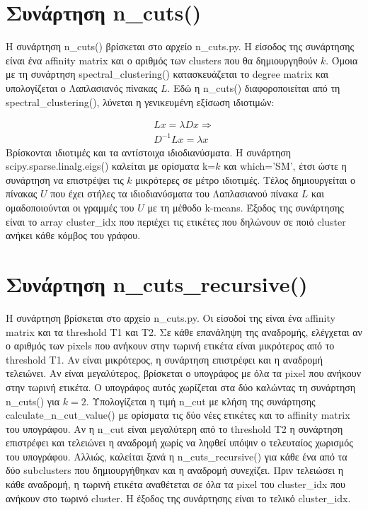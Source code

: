 \documentclass{article}
\begin{document}
\section{Συνάρτηση n\_cuts()}
Η συνάρτηση n\_cuts() βρίσκεται στο αρχείο n\_cuts.py. Η είσοδος της συνάρτησης 
είναι ένα affinity matrix και ο αριθμός των clusters που θα δημιουργηθούν $k$.
Όμοια με τη συνάρτηση spectral\_clustering() κατασκευάζεται το degree matrix 
και υπολογίζεται ο Λαπλασιανός πίνακας $L$. Εδώ η n\_cuts() διαφοροποιείται από τη
spectral\_clustering(), λύνεται η γενικευμένη εξίσωση ιδιοτιμών:

\begin{gather}
    Lx = \lambda Dx \Rightarrow \\
    D^{-1} Lx = \lambda x
\end{gather}
Βρίσκονται ιδιοτιμές και τα αντίστοιχα ιδιοδιανύσματα. Η συνάρτηση 
scipy.sparse.linalg.eigs() καλείται με ορίσμα\-τα k=$k$ και 
which='SM', έτσι ώστε η συνάρτηση να επιστρέψει τις $k$ μικρότερες σε μέτρο
ιδιοτιμές. Τέλος δημιουργεί\-ται ο πίνακας $U$
που έχει στήλες τα ιδιοδιανύσματα του Λαπλασιανού πίνακα $L$ και ομαδοποιούνται
οι γραμμές του $U$ με τη μέθοδο k-means. Έξοδος της συνάρτησης είναι το array 
cluster\_idx που περιέχει τις ετικέτες που δηλώνουν σε ποιό cluster ανήκει κάθε
κόμβος του γράφου.

\section{Συνάρτηση n\_cuts\_recursive()}
Η συνάρτηση βρίσκεται στο αρχείο n\_cuts.py. Οι είσοδοί της είναι ένα affinity matrix 
και τα threshold T1 και T2. Σε κάθε επανάληψη της αναδρομής,
ελέγχεται αν ο αριθμός των pixels που ανήκουν στην τωρινή ετικέτα είναι μικρότερος
από το threshold T1. Αν είναι μικρότερος, η συνάρτηση επιστρέφει 
και η αναδρομή τελειώνει. Αν είναι μεγαλύτερος, βρίσκεται ο υπογράφος με 
όλα τα pixel που ανήκουν στην τωρινή ετικέτα. Ο
υπογράφος αυτός χωρίζεται στα δύο καλώντας τη συνάρτηση n\_cuts() για $k=2$. 
Υπολογίζεται η τιμή n\_cut με κλήση της συνάρτησης calculate\_n\_cut\_va\-lue()
με ορίσματα τις δύο νέες ετικέτες και το affinity matrix του υπογράφου.
Αν η n\_cut είναι μεγαλύτερη από το threshold T2 η συνάρτηση επιστρέφει και τελειώνει η
αναδρομή χωρίς να ληφθεί υπόψιν ο τελευταίος χωρισμός του υπογράφου. Αλλιώς,
καλείται ξανά η n\_cuts\_recursive() για κάθε ένα από τα δύο subclusters 
που δημιουργήθηκαν και η αναδρομή συνεχίζει. Πριν τελειώσει η 
κάθε αναδρομή, η τωρινή ετικέτα αναθέτεται σε όλα τα pixel
του cluster\_idx που ανήκουν  στο τωρινό cluster. Η έξοδος της
συνάρτησης είναι το τελικό cluster\_idx.
\end{document}
